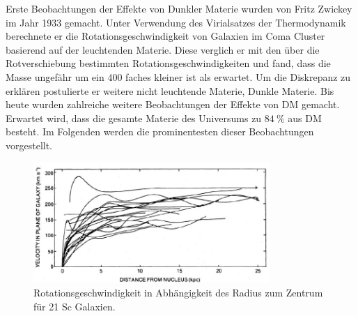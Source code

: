 Erste Beobachtungen der Effekte von Dunkler Materie wurden von Fritz Zwickey im Jahr 1933 gemacht.
Unter Verwendung des Virialsatzes der Thermodynamik berechnete er die Rotationsgeschwindigkeit von Galaxien im Coma Cluster basierend auf der leuchtenden Materie.
Diese verglich er mit den über die Rotverschiebung bestimmten Rotationsgeschwindigkeiten und fand, dass die Masse ungefähr um ein $400$ faches kleiner ist als erwartet.\cite{Zwicky1933}
Um die Diskrepanz zu erklären postulierte er weitere nicht leuchtende Materie, Dunkle Materie.
Bis heute wurden zahlreiche weitere Beobachtungen der Effekte von DM gemacht.
Erwartet wird, dass die gesamte Materie des Universums zu $\SI{84}{\percent}$\cite{Adam2016} aus DM besteht.
Im Folgenden werden die prominentesten dieser Beobachtungen vorgestellt.

\begin{figure}[!b]
\begin{center}
\includegraphics[width=0.8\textwidth]{./fig/Rubin80.pdf}
\end{center}
\caption{Rotationsgeschwindigkeit in Abhängigkeit des Radius zum Zentrum für 21 Sc Galaxien.\cite{Rubin80}}
\label{fig:Rubin21Sc}
\end{figure}

